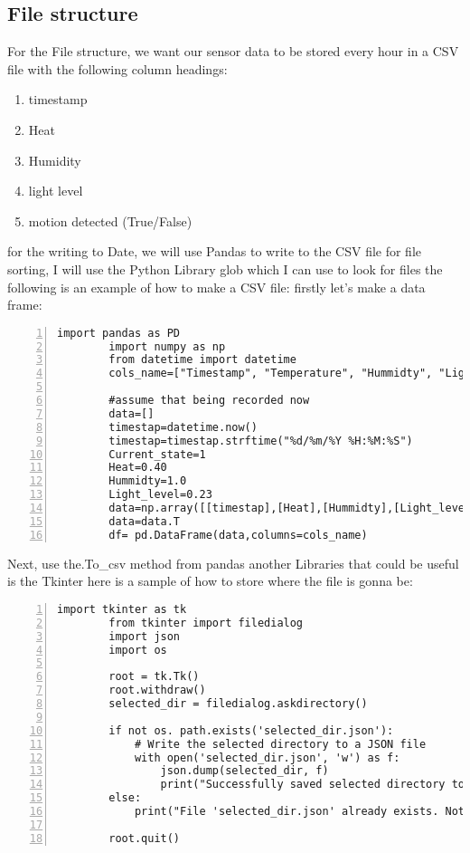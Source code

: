 	\subsection{File structure}
	For the  File structure, we want our sensor data to be stored every hour in a  CSV file with the following column headings:
	\begin{enumerate}
		\item timestamp
		\item Heat
		\item Humidity
		\item light level
		\item motion detected (True/False)
	\end{enumerate}
	for the writing to Date, we will use Pandas to write to the CSV file
	for file sorting, I will use the Python Library glob  which I can use  to look for  files 
	the following is an example of how  to  make a CSV file:
	firstly let's make a data frame:
	\begin{lstlisting}[style=mystyle,caption={sample code for turning sensor data into a data},numbers=left,firstnumber=1]
		import pandas as PD
		import numpy as np
		from datetime import datetime
		cols_name=["Timestamp", "Temperature", "Hummidty", "Light_level", "Motion_dected"]

		#assume that being recorded now
		data=[]
		timestap=datetime.now()
		timestap=timestap.strftime("%d/%m/%Y %H:%M:%S")
		Current_state=1
		Heat=0.40
		Hummidty=1.0
		Light_level=0.23
		data=np.array([[timestap],[Heat],[Hummidty],[Light_level],[Current_state]])
		data=data.T
		df= pd.DataFrame(data,columns=cols_name)
	\end{lstlisting}
	Next, use the.To\_csv method from  pandas
	another Libraries that could  be useful is the Tkinter
	here is a  sample of how to   store where the  file is  gonna be:
	\begin{lstlisting}[style=mystyle,caption={example code for storing directory},numbers=left,firstnumber=1]
		import tkinter as tk
		from tkinter import filedialog
		import json
		import os

		root = tk.Tk()
		root.withdraw()
		selected_dir = filedialog.askdirectory()

		if not os. path.exists('selected_dir.json'):
			# Write the selected directory to a JSON file
			with open('selected_dir.json', 'w') as f:
				json.dump(selected_dir, f)
				print("Successfully saved selected directory to JSON file.")
		else:
			print("File 'selected_dir.json' already exists. Not saving the directory.")

		root.quit()
	\end{lstlisting}
